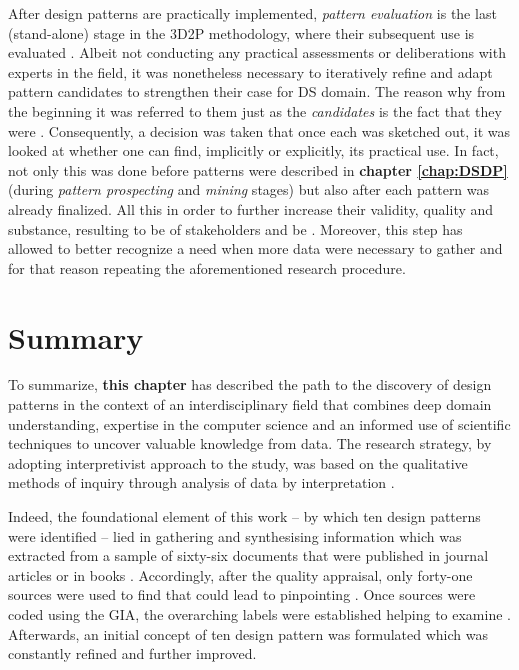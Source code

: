 After design patterns are practically implemented, \emph{pattern evaluation} is the last (stand-alone) stage in the \ac{3D2P} methodology, where their subsequent use is evaluated \parencite{InventadoPeter2015}. 
Albeit not conducting any practical assessments or deliberations with experts in the field, it was nonetheless necessary to iteratively refine and adapt pattern candidates to strengthen their case for \ac{DS} domain. 
The reason why from the beginning it was referred to them just as the \emph{candidates} is the fact that they were  \parencite[5]{InventadoPeter2015}. 
Consequently, a decision was taken that once each was sketched out, it was looked at whether one can find, implicitly or explicitly, its practical use.
In fact, not only this was done before patterns were described in \textbf{chapter \ref{chap:DSDP}} (during \emph{pattern prospecting} and \emph{mining} stages) but also after each pattern was already finalized.
All this in order to further increase their validity, quality and substance, resulting to be  of stakeholders and be  \parencite[5]{InventadoPeter2015}. 
Moreover, this step has allowed to better recognize a need when more data were necessary to gather and for that reason repeating the aforementioned research procedure. 

\section{Summary}
To summarize, \textbf{this chapter} has described the path to the discovery of design patterns in the context of an interdisciplinary field that combines deep domain understanding, expertise in the computer science and an informed use of scientific techniques to uncover valuable knowledge from data. 
The research strategy, by adopting interpretivist approach to the study, was based on the qualitative methods of inquiry through analysis of data by interpretation \parencite{Okoli2010}.

Indeed, the foundational element of this work -- by which ten design patterns were identified -- lied in gathering and synthesising information which was extracted from a sample of sixty-six documents that were published in journal articles or in books \parencite{Trochim2006}.
Accordingly, after the quality appraisal, only forty-one sources were used to find  that could lead to pinpointing  \parencite[5]{InventadoPeter2015}.
Once sources were coded using the \ac{GIA}, the overarching labels were established helping to examine  \parencite[4]{InventadoPeter2015}. 
Afterwards, an initial concept of ten design pattern was formulated which was constantly refined and further improved. 

